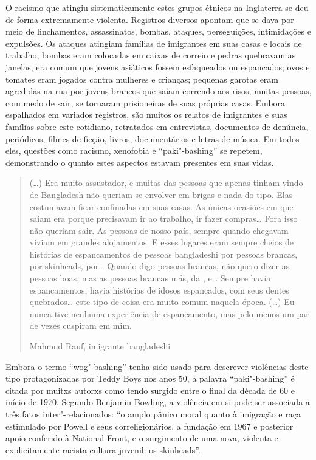 O racismo que atingiu sistematicamente estes grupos étnicos na Inglaterra se deu de forma extremamente violenta. Registros diversos apontam que se dava por meio de linchamentos, assassinatos, bombas, ataques, perseguições, intimidações e expulsões. Os ataques atingiam famílias de imigrantes em suas casas e locais de trabalho, bombas eram colocadas em caixas de correio e pedras quebravam as janelas; era comum que jovens asiáticos fossem esfaqueados ou espancados; ovos e tomates eram jogados contra mulheres e crianças; pequenas garotas eram agredidas na rua por jovens brancos que saíam correndo aos risos; muitas pessoas, com medo de sair, se tornaram prisioneiras de suas próprias casas. Embora espalhados em variados registros, são muitos os relatos de imigrantes e suas famílias sobre este cotidiano, retratados em entrevistas, documentos de denúncia, periódicos, filmes de ficção, livros, documentários e letras de música. Em todos eles, questões como racismo, xenofobia e ``paki"-bashing'' se repetem, demonstrando o quanto estes aspectos estavam presentes em suas vidas.

\begin{quote}
(\ldots{}) Era muito assustador, e muitas das pessoas que apenas tinham vindo de Bangladesh não queriam se envolver em brigas e nada do tipo. Elas costumavam ficar confinadas em suas casas. As únicas ocasiões em que saíam era porque precisavam ir ao trabalho, ir fazer compras\ldots{} Fora isso não queriam sair. As pessoas de nosso país, sempre quando chegavam viviam em grandes alojamentos. E esses lugares eram sempre cheios de histórias de espancamentos de pessoas bangladeshi por pessoas brancas, por skinheads, por\ldots{} Quando digo pessoas brancas, não quero dizer as pessoas boas, mas as pessoas brancas más, da , e\ldots{} Sempre havia espancamentos, havia histórias de idosos espancados, com seus dentes quebrados\ldots{} este tipo de coisa era muito comum naquela época. (\ldots{}) Eu nunca tive nenhuma experiência de espancamento, mas pelo menos um par de vezes cuspiram em mim.

Mahmud Rauf, imigrante bangladeshi
\end{quote}

Embora o termo ``wog"-bashing'' tenha sido usado para descrever violências deste tipo protagonizadas por Teddy Boys nos anos 50, a palavra ``paki"-bashing'' é citada por muitxs autorxs como tendo surgido entre o final da década de 60 e início de 1970. Segundo Benjamin Bowling, a violência em si pode ser associada a três fatos inter"-relacionados: ``o amplo pânico moral quanto à imigração e raça estimulado por Powell e seus correligionários, a fundação em 1967 e posterior apoio conferido à National Front, e o surgimento de uma nova, violenta e explicitamente racista cultura juvenil: os skinheads''.

